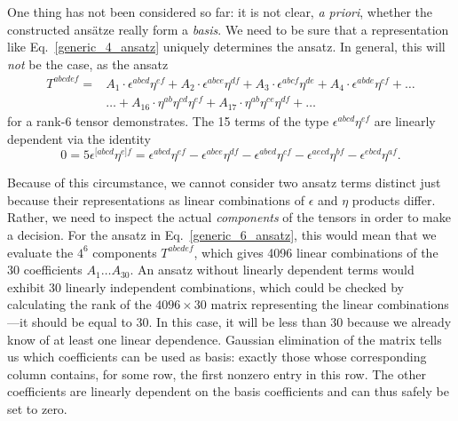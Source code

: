 One thing has not been considered so far: it is not clear, \emph{a priori}, whether the constructed ansätze really form a \emph{basis}. We need to be sure that a representation like Eq.\ \eqref{generic_4_ansatz} uniquely determines the ansatz. In general, this will \emph{not} be the case, as the ansatz
\begin{equation}\label{generic_6_ansatz}
  \begin{aligned}
    T^{abcdef} = {} & A_1 \cdot \epsilon^{abcd} \eta^{ef} + A_2 \cdot \epsilon^{abce} \eta^{df} + A_3 \cdot \epsilon^{abcf} \eta^{de} + A_4 \cdot \epsilon^{abde} \eta^{cf} + \dots \\
    {} & \dots + A_{16} \cdot \eta^{ab} \eta^{cd} \eta^{ef} + A_{17} \cdot \eta^{ab} \eta^{ce} \eta^{df} + \dots
  \end{aligned}
\end{equation}
for a rank-6 tensor demonstrates. The 15 terms of the type $\epsilon^{abcd}\eta^{ef}$ are linearly dependent via the identity
\begin{equation}
  0 = 5 \epsilon^{\lbrack abcd}\eta^{e\rbrack f} = \epsilon^{abcd} \eta^{ef} - \epsilon^{abce} \eta^{df} - \epsilon^{abed} \eta^{cf} - \epsilon^{aecd} \eta^{bf} - \epsilon^{ebcd} \eta^{af}.
\end{equation}

Because of this circumstance, we cannot consider two ansatz terms distinct just because their representations as linear combinations of $\epsilon$ and $\eta$ products differ. Rather, we need to inspect the actual \emph{components} of the tensors in order to make a decision. For the ansatz in Eq.\ \eqref{generic_6_ansatz}, this would mean that we evaluate the $4^6$ components $T^{abcdef}$, which gives 4096 linear combinations of the 30 coefficients $A_1\dots A_{30}$. An ansatz without linearly dependent terms would exhibit 30 linearly independent combinations, which could be checked by calculating the rank of the $4096\times 30$ matrix representing the linear combinations---it should be equal to 30. In this case, it will be less than 30 because we already know of at least one linear dependence. Gaussian elimination of the matrix tells us which coefficients can be used as basis: exactly those whose corresponding column contains, for some row, the first nonzero entry in this row. The other coefficients are linearly dependent on the basis coefficients and can thus safely be set to zero.

